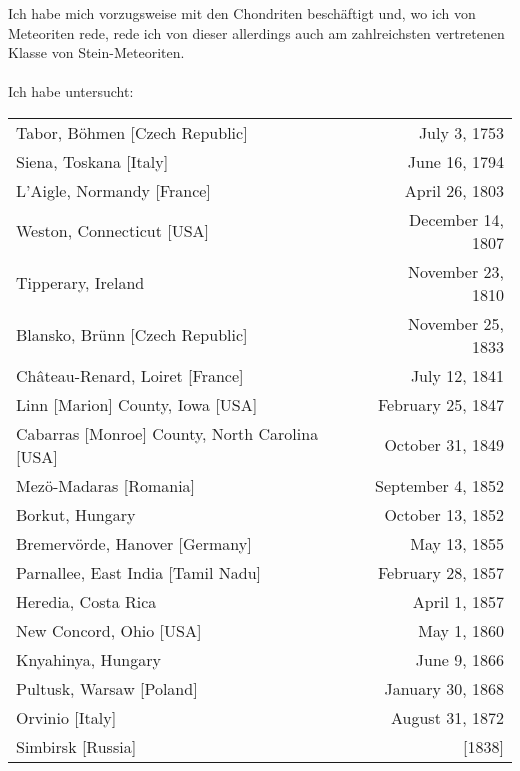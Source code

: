 \documentclass[a4paper, 12pt, oneside]{article}
\begin{document}
Ich habe mich vorzugsweise mit den Chondriten beschäftigt und, wo ich von Meteoriten rede, rede ich von dieser allerdings auch am zahlreichsten vertretenen Klasse von Stein-Meteoriten.
\paragraph{}
Ich habe untersucht:
\begin{center}
\begin{tabular}{ l r }
 Tabor, Böhmen [Czech Republic] & July 3, 1753\index{meteorite!Tabor} \\
 Siena, Toskana [Italy] & June 16, 1794\index{meteorite!Siena} \\
 L'Aigle, Normandy [France] & April 26, 1803\index{meteorite!L'Aigle} \\
 Weston, Connecticut [USA] & December 14, 1807\index{meteorite!Weston} \\
 Tipperary, Ireland & November 23, 1810\index{meteorite!Tipperary} \\
 Blansko, Brünn [Czech Republic] & November 25, 1833\index{meteorite!Blansko} \\
 Château-Renard, Loiret [France] & July 12, 1841\index{meteorite!Château-Renard} \\
 Linn [Marion] County, Iowa [USA] & February 25, 1847\index{meteorite!Marion County}\index{meteorite!Linn} \\
 Cabarras [Monroe] County, North Carolina [USA] & October 31, 1849\index{meteorite!Monroe County}\index{meteorite!Cabarras} \\
 Mezö-Madaras [Romania] & September 4, 1852\index{meteorite!Mezö-Madaras} \\
 Borkut, Hungary & October 13, 1852\index{meteorite!Borkut} \\
 Bremervörde, Hanover [Germany] & May 13, 1855\index{meteorite!Bremervörde} \\
 Parnallee, East India [Tamil Nadu] & February 28, 1857\index{meteorite!Parnallee} \\
 Heredia, Costa Rica & April 1, 1857\index{meteorite!Heredia} \\
 New Concord, Ohio [USA] & May 1, 1860\index{meteorite!New Concord} \\
 Knyahinya, Hungary & June 9, 1866\index{meteorite!Knyahinya} \\
 Pultusk, Warsaw [Poland] & January 30, 1868\index{meteorite!Pultusk} \\
 Orvinio [Italy] & August 31, 1872\index{meteorite!Olvinio} \\
 Simbirsk [Russia] & [1838]\index{meteorite!Simbirsk} \\
\end{tabular}
\end{center}
\clearpage
\end{document}
